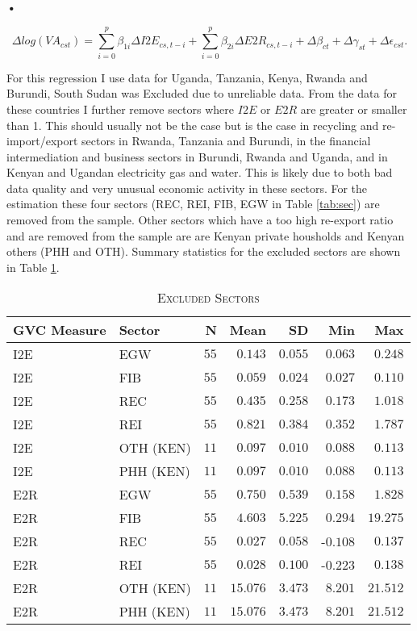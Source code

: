 \textbf{\textbf{•}}\documentclass[a4paper]{article}
\begin{document}
\begin{equation} \label{eq:GROWTH_HDFE}
\Delta log(VA_{cst}) = \sum_{i=0}^p \beta_{1i} \Delta I2E_{cs,t-i} + \sum_{i = 0}^p \beta_{2i} \Delta E2R_{cs,t-i}  + \Delta\beta_{ct} + \Delta\gamma_{st} + \Delta\epsilon_{cst}.
\end{equation}

For this regression I use data for Uganda, Tanzania, Kenya, Rwanda and Burundi, South Sudan was Excluded due to unreliable data. From the data for these countries I further remove sectors where $I2E$ or $E2R$ are greater or smaller than 1. This should usually not be the case but is the case in recycling and re-import/export sectors in Rwanda, Tanzania and Burundi, in the financial intermediation and business sectors in Burundi, Rwanda and Uganda, and in Kenyan and Ugandan electricity gas and water. This is likely due to both bad data quality and very unusual economic activity in these sectors. For the estimation these four sectors (REC, REI, FIB, EGW in Table \ref{tab:sec}) are removed from the sample. Other sectors which have a too high re-export ratio and are removed from the sample are are Kenyan private housholds and  Kenyan others (PHH and OTH). Summary statistics for the excluded sectors are shown in Table \ref{tab:EXCL_SEC}.

\begin{table}[h!] \centering 
  \caption{\label{tab:EXCL_SEC}\textsc{Excluded Sectors}}
  \vspace{2mm}
\begin{tabular}{ llrrrrr} \toprule
GVC Measure & Sector & N & Mean & SD & Min & Max \\ 
\midrule
I2E & EGW & $55$ & $0.143$ & $0.055$ & $0.063$ & $0.248$ \\ 
I2E & FIB & $55$ & $0.059$ & $0.024$ & $0.027$ & $0.110$ \\ 
I2E & REC & $55$ & $0.435$ & $0.258$ & $0.173$ & $1.018$ \\ 
I2E & REI & $55$ & $0.821$ & $0.384$ & $0.352$ & $1.787$ \\ 
I2E & OTH (KEN) & $11$ & $0.097$ & $0.010$ & $0.088$ & $0.113$ \\ 
I2E & PHH (KEN) & $11$ & $0.097$ & $0.010$ & $0.088$ & $0.113$ \\ 
E2R & EGW & $55$ & $0.750$ & $0.539$ & $0.158$ & $1.828$ \\ 
E2R & FIB & $55$ & $4.603$ & $5.225$ & $0.294$ & $19.275$ \\ 
E2R & REC & $55$ & $0.027$ & $0.058$ & -$0.108$ & $0.137$ \\ 
E2R & REI & $55$ & $0.028$ & $0.100$ & -$0.223$ & $0.138$ \\ 
E2R & OTH (KEN) & $11$ & $15.076$ & $3.473$ & $8.201$ & $21.512$ \\ 
E2R & PHH (KEN) & $11$ & $15.076$ & $3.473$ & $8.201$ & $21.512$ \\ 
\bottomrule
\end{tabular} 
\end{table} 
\end{document}
